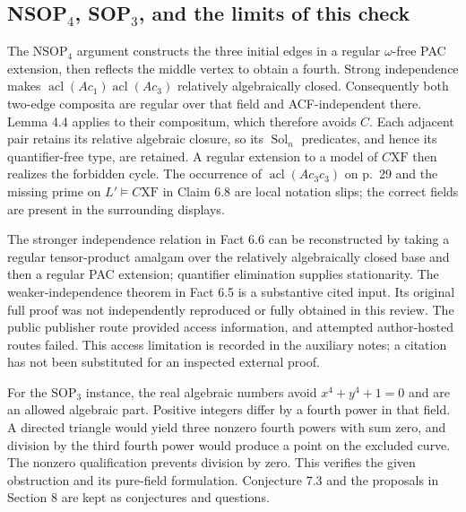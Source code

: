 \documentclass[10pt]{article}
\begin{document}
\subsection*{NSOP\(_4\), SOP\(_3\), and the limits of this check}
The NSOP\(_4\) argument constructs the three initial edges in a regular \(\omega\)-free PAC extension, then reflects the middle vertex to obtain a fourth. Strong independence makes \(\operatorname{acl}(Ac_1)\operatorname{acl}(Ac_3)\) relatively algebraically closed. Consequently both two-edge composita are regular over that field and ACF-independent there. Lemma 4.4 applies to their compositum, which therefore avoids \(C\). Each adjacent pair retains its relative algebraic closure, so its \(\operatorname{Sol}_n\) predicates, and hence its quantifier-free type, are retained. A regular extension to a model of \(C\mathrm{XF}\) then realizes the forbidden cycle. The occurrence of \(\operatorname{acl}(Ac_3c_3)\) on p. 29 and the missing prime on \(L'\models C\mathrm{XF}\) in Claim 6.8 are local notation slips; the correct fields are present in the surrounding displays.\par
The stronger independence relation in Fact 6.6 can be reconstructed by taking a regular tensor-product amalgam over the relatively algebraically closed base and then a regular PAC extension; quantifier elimination supplies stationarity. The weaker-independence theorem in Fact 6.5 is a substantive cited input. Its original full proof was not independently reproduced or fully obtained in this review. The public publisher route provided access information, and attempted author-hosted routes failed. This access limitation is recorded in the auxiliary notes; a citation has not been substituted for an inspected external proof.\par
For the SOP\(_3\) instance, the real algebraic numbers avoid \(x^4+y^4+1=0\) and are an allowed algebraic part. Positive integers differ by a fourth power in that field. A directed triangle would yield three nonzero fourth powers with sum zero, and division by the third fourth power would produce a point on the excluded curve. The nonzero qualification prevents division by zero. This verifies the given obstruction and its pure-field formulation. Conjecture 7.3 and the proposals in Section 8 are kept as conjectures and questions.\par
\end{document}
